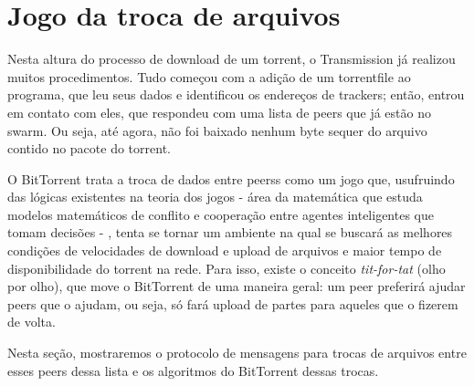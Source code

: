 
\newpage
\section{Jogo da troca de arquivos}
\label{sec:titfortat}

Nesta altura do processo de download de um \gls*{torrent}, o Transmission já realizou
muitos procedimentos. Tudo começou com a adição de um \gls*{torrentfile} ao programa,
que leu seus dados e identificou os endereços de \glspl*{tracker}; então, entrou em
contato com eles, que respondeu com uma lista de \glspl*{peer} que já estão no
\gls*{swarm}. Ou seja, até agora, não foi baixado nenhum byte sequer do arquivo contido
no pacote do \gls*{torrent}.

O BitTorrent trata a troca de dados entre \glspl*{peers} como um jogo que, usufruindo
das lógicas existentes na teoria dos jogos - área da matemática que estuda modelos
matemáticos de conflito e cooperação entre agentes inteligentes que tomam decisões -
, tenta se tornar um ambiente na qual se buscará as melhores condições de velocidades
de download e upload de arquivos e maior tempo de disponibilidade do \gls*{torrent} na
rede. Para isso, existe o conceito \emph{tit-for-tat} (olho por olho), que move o
BitTorrent de uma maneira geral: um \gls*{peer} preferirá ajudar \glspl*{peer} que o
ajudam, ou seja, só fará upload de partes para aqueles que o fizerem de volta.

Nesta seção, mostraremos o protocolo de mensagens para trocas de arquivos entre esses
\glspl*{peer} dessa lista e os algoritmos do BitTorrent dessas trocas.







